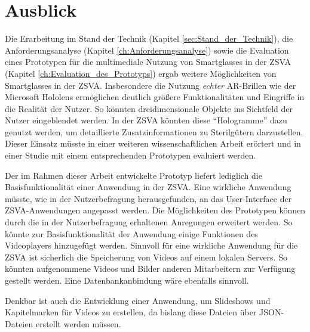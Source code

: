 %
%
%
%
%
%
\chapter{Ausblick}
\label{ch:Ausblick}
%
Die Erarbeitung im Stand der Technik (Kapitel \ref{sec:Stand_der_Technik}), die Anforderungsanalyse (Kapitel \ref{ch:Anforderungsanalyse}) sowie die Evaluation eines Prototypen für die multimediale Nutzung von Smartglasses in der ZSVA (Kapitel \ref{ch:Evaluation_des_Prototyps}) ergab weitere Möglichkeiten von Smartglasses in der ZSVA. Insbesondere die Nutzung \emph{echter} AR-Brillen wie der Microsoft Hololens ermöglichen deutlich größere Funktionalitäten und Eingriffe in die Realität der Nutzer. So könnten dreidimensionale Objekte ins Sichtfeld der Nutzer eingeblendet werden. In der ZSVA könnten diese \enquote{Hologramme} dazu genutzt werden, um detaillierte Zusatzinformationen zu Sterilgütern darzustellen. Dieser Einsatz müsste in einer weiteren wissenschaftlichen Arbeit erörtert und in einer Studie mit einem entsprechenden Prototypen evaluiert werden.

Der im Rahmen dieser Arbeit entwickelte Prototyp liefert lediglich die Basisfunktionalität einer Anwendung in der ZSVA. Eine wirkliche Anwendung müsste, wie in der Nutzerbefragung herausgefunden, an das User-Interface der ZSVA-Anwendungen angepasst werden. Die Möglichkeiten des Prototypen können durch die in der Nutzerbefragung erhaltenen Anregungen erweitert werden. So könnte zur Basisfunktionalität der Anwendung einige Funktionen des Videoplayers hinzugefügt werden. Sinnvoll für eine wirkliche Anwendung für die ZSVA ist sicherlich die Speicherung von Videos auf einem lokalen Servers. So könnten aufgenommene Videos und Bilder anderen Mitarbeitern zur Verfügung gestellt werden. Eine Datenbankanbindung wäre ebenfalls sinnvoll. 

Denkbar ist auch die Entwicklung einer Anwendung, um Slideshows und Kapitelmarken für Videos zu erstellen, da bislang diese Dateien über JSON-Dateien erstellt werden müssen.
%
